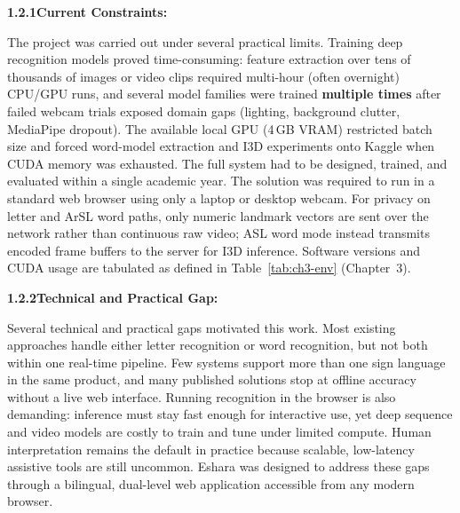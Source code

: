 \noindent\textbf{1.2.1\quad Current Constraints:}\par
{}
\vspace{0.3cm}

\noindent The project was carried out under several practical limits. Training deep recognition models proved time-consuming: feature extraction over tens of thousands of images or video clips required multi-hour (often overnight) CPU/GPU runs, and several model families were trained \textbf{multiple times} after failed webcam trials exposed domain gaps (lighting, background clutter, MediaPipe dropout). The available local GPU (4\,GB VRAM) restricted batch size and forced word-model extraction and I3D experiments onto Kaggle when CUDA memory was exhausted. The full system had to be designed, trained, and evaluated within a single academic year. The solution was required to run in a standard web browser using only a laptop or desktop webcam. For privacy on letter and ArSL word paths, only numeric landmark vectors are sent over the network rather than continuous raw video; ASL word mode instead transmits encoded frame buffers to the server for I3D inference. Software versions and CUDA usage are tabulated as defined in Table~\ref{tab:ch3-env} (Chapter~3).\par\vspace{0.4cm}

\noindent\textbf{1.2.2\quad Technical and Practical Gap:}\par
{}
\vspace{0.3cm}

\noindent Several technical and practical gaps motivated this work. Most existing approaches handle either letter recognition or word recognition, but not both within one real-time pipeline. Few systems support more than one sign language in the same product, and many published solutions stop at offline accuracy without a live web interface. Running recognition in the browser is also demanding: inference must stay fast enough for interactive use, yet deep sequence and video models are costly to train and tune under limited compute. Human interpretation remains the default in practice because scalable, low-latency assistive tools are still uncommon. Eshara was designed to address these gaps through a bilingual, dual-level web application accessible from any modern browser.\par\vspace{0.6cm}

